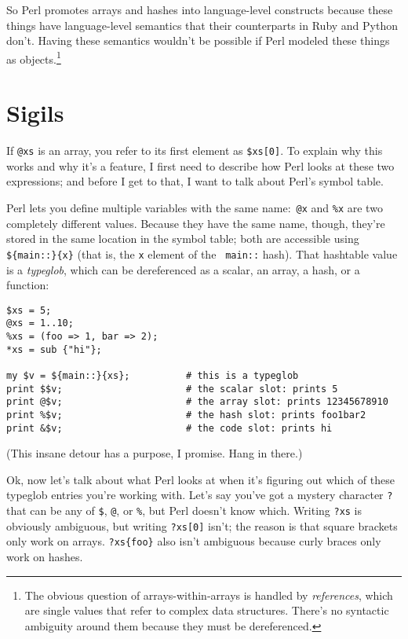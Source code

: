 \documentclass{article}
\begin{document}
So Perl promotes arrays and hashes into language-level constructs because these
things have language-level semantics that their counterparts in Ruby and Python
don't. Having these semantics wouldn't be possible if Perl modeled these things
as objects.\footnote{The obvious question of arrays-within-arrays is handled by
{\em references}, which are single values that refer to complex data
structures. There's no syntactic ambiguity around them because they must be
dereferenced.}

\section{Sigils}

If \verb|@xs| is an array, you refer to its first element as \verb|$xs[0]|. To
explain why this works and why it's a feature, I first need to describe how
Perl looks at these two expressions; and before I get to that, I want to talk
about Perl's symbol table.

Perl lets you define multiple variables with the same name:~\verb|@x| and
\verb|%x| are two completely different values. Because they have the same name,
though, they're stored in the same location in the symbol table; both are
accessible using \verb|${main::}{x}| (that is, the {\tt x} element of the {\tt
main::} hash). That hashtable value is a {\em typeglob}, which can be
dereferenced as a scalar, an array, a hash, or a function:

\begin{verbatim}
$xs = 5;
@xs = 1..10;
%xs = (foo => 1, bar => 2);
*xs = sub {"hi"};

my $v = ${main::}{xs};          # this is a typeglob
print $$v;                      # the scalar slot: prints 5
print @$v;                      # the array slot: prints 12345678910
print %$v;                      # the hash slot: prints foo1bar2
print &$v;                      # the code slot: prints hi
\end{verbatim}

(This insane detour has a purpose, I promise. Hang in there.)

Ok, now let's talk about what Perl looks at when it's figuring out which of
these typeglob entries you're working with. Let's say you've got a mystery
character \verb|?| that can be any of \verb|$|, \verb|@|, or \verb|%|, but Perl
doesn't know which. Writing \verb|?xs| is obviously ambiguous, but writing
\verb|?xs[0]| isn't; the reason is that square brackets only work on arrays.
\verb|?xs{foo}| also isn't ambiguous because curly braces only work on hashes.
\end{document}
